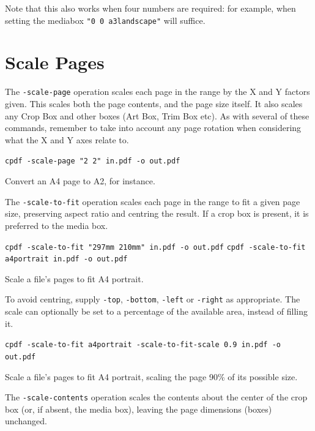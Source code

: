 \documentclass{book}
\begin{document}
\noindent Note that this also works when four numbers are required: for example, when setting the mediabox \texttt{"0 0 a3landscape"} will suffice.

  \section{Scale Pages}
  The \texttt{-scale-page} operation scales each page in the range by the X and
Y factors given. This scales both the page contents, and the page size itself. It also scales any Crop Box and other boxes (Art Box, Trim Box etc). As with several of these commands, remember to take into account any page rotation when considering what the X and Y axes relate to.

  \begin{framed}
  \small\noindent\verb!cpdf -scale-page "2 2" in.pdf -o out.pdf!

  \vspace{2.5mm}
  \noindent Convert an A4 page to A2, for instance.
  \end{framed}

  \noindent The \texttt{-scale-to-fit} operation scales each page in the range to fit a
  given page size, preserving aspect ratio and centring the result. If a crop box is present, it is preferred to the media box.

  \begin{framed}
  \small\noindent\verb!cpdf -scale-to-fit "297mm 210mm" in.pdf -o out.pdf!
  \small\noindent\verb!cpdf -scale-to-fit a4portrait in.pdf -o out.pdf!

  \vspace{2.5mm}
  \noindent Scale a file's pages to fit A4 portrait.
  \end{framed}
  
\noindent To avoid centring, supply \texttt{-top}, \texttt{-bottom}, \texttt{-left} or \texttt{-right} as appropriate. The scale can optionally be set to a percentage of the available area, instead of filling it.
  \begin{framed}
  \small\noindent\verb!cpdf -scale-to-fit a4portrait -scale-to-fit-scale 0.9 in.pdf -o out.pdf!


  \vspace{2.5mm}
  \noindent Scale a file's pages to fit A4 portrait, scaling the page 90\% of its possible size.
  \end{framed}

\noindent The \texttt{-scale-contents} operation scales the contents about the center
  of the crop box (or, if absent, the media box), leaving the page dimensions
  (boxes) unchanged.
\end{document}
